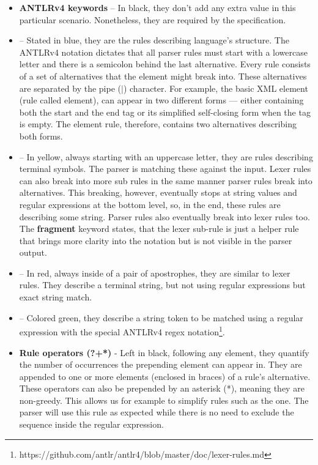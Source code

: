 \begin{itemize}
	\item \textbf{ANTLRv4 keywords} -- In black, they don't add any extra value in this particular scenario.
	Nonetheless, they are required by the specification.

	\item {} -- Stated in blue, they are the rules describing language's structure.
	The ANTLRv4 notation dictates that all parser rules must start with a lowercase letter and there is a semicolon behind the last alternative.
	Every rule consists of a set of alternatives that the element might break into.
	These alternatives are separated by the pipe ($|$) character.
	For example, the basic XML element (rule called element), can appear in two different forms --- either containing both the start and the end tag or its simplified self-closing form when the tag is empty.
	The element rule, therefore, contains two alternatives describing both forms.

	\item {} -- In yellow, always starting with an uppercase letter, they are rules describing terminal symbols.
	The parser is matching these against the input.
	Lexer rules can also break into more sub rules in the same manner parser rules break into alternatives.
	This breaking, however, eventually stops at string values and regular expressions at the bottom level, so, in the end, these rules are describing some string.
	Parser rules also eventually break into lexer rules too.
	The \textbf{fragment} keyword states, that the lexer sub-rule is just a helper rule that brings more clarity into the notation but is not visible in the parser output.

	\item {} -- In red, always inside of a pair of apostrophes, they are similar to lexer rules.
	They describe a terminal string, but not using regular expressions but exact string match.

	\item {} -- Colored green, they describe a string token to be matched using a regular expression with the special ANTLRv4 regex notation\footnote{https://github.com/antlr/antlr4/blob/master/doc/lexer-rules.md}.

	\item \textbf{Rule operators (?+*)} - Left in black, following any element, they quantify the number of occurrences the prepending element can appear in.
	They are appended to one or more elements (enclosed in braces) of a rule's alternative.
	These operators can also be prepended by an asterisk (*), meaning they are non-greedy.
	This allows us for example to simplify rules such as the  one.
	The parser will use this rule as expected while there is no need to exclude the \literal{\texttt{]]>}} sequence inside the regular expression.
\end{itemize}